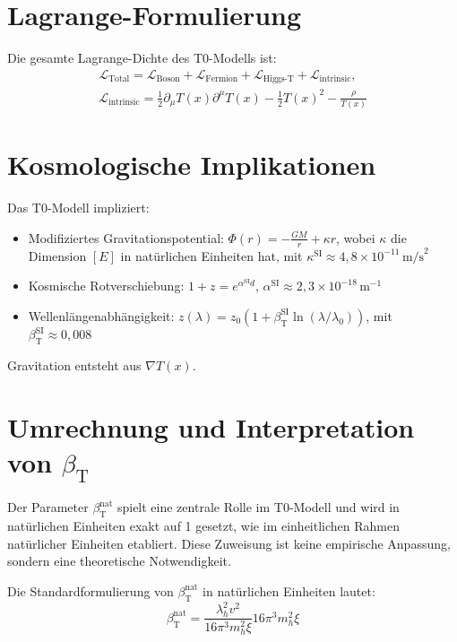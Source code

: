 \documentclass[a4paper,12pt]{article}
\newcommand{\Tfield}{T(x)}
\newcommand{\betaT}{\beta_{\text{T}}}
\begin{document}
	\section{Lagrange-Formulierung}
	Die gesamte Lagrange-Dichte des T0-Modells ist:
	\begin{multline}
		\mathcal{L}_{\text{Total}} = \mathcal{L}_{\text{Boson}} + \mathcal{L}_{\text{Fermion}} + \mathcal{L}_{\text{Higgs-T}} + \mathcal{L}_{\text{intrinsic}}, \\
		\mathcal{L}_{\text{intrinsic}} = \frac{1}{2} \partial_\mu \Tfield \partial^\mu \Tfield - \frac{1}{2}\Tfield^2 - \frac{\rho}{\Tfield}
	\end{multline}
	
	\section{Kosmologische Implikationen}
	Das T0-Modell impliziert:
	\begin{itemize}
		\item Modifiziertes Gravitationspotential: \( \Phi(r) = -\frac{GM}{r} + \kappa r \), wobei \(\kappa\) die Dimension \([E]\) in natürlichen Einheiten hat, mit \(\kappa^{\text{SI}} \approx 4,8 \times 10^{-11} \, \text{m/s}^2 \)
		\item Kosmische Rotverschiebung: \( 1 + z = e^{\alpha^{\text{SI}} d} \), \( \alpha^{\text{SI}} \approx 2,3 \times 10^{-18} \, \text{m}^{-1} \)
		\item Wellenlängenabhängigkeit: \( z(\lambda) = z_0 (1 + \betaT^{\text{SI}} \ln(\lambda/\lambda_0)) \), mit \(\betaT^{\text{SI}} \approx 0,008\)
	\end{itemize}
	Gravitation entsteht aus \( \nabla \Tfield \).
	
	\section{Umrechnung und Interpretation von \(\betaT\)}
	\label{subsec:beta_conversion_interpretation}
	
	Der Parameter \(\betaT^{\text{nat}}\) spielt eine zentrale Rolle im T0-Modell und wird in natürlichen Einheiten exakt auf 1 gesetzt, wie im einheitlichen Rahmen natürlicher Einheiten etabliert. Diese Zuweisung ist keine empirische Anpassung, sondern eine theoretische Notwendigkeit.
	
	Die Standardformulierung von \(\betaT^{\text{nat}}\) in natürlichen Einheiten lautet:
	\begin{equation}
		\betaT^{\text{nat}} = \frac{\lambda_h^2 v^2}{16\pi^3 m_h^2 \xi}{16\pi^3 m_h^2 \xi}
	\end{equation}
	
\end{document}
